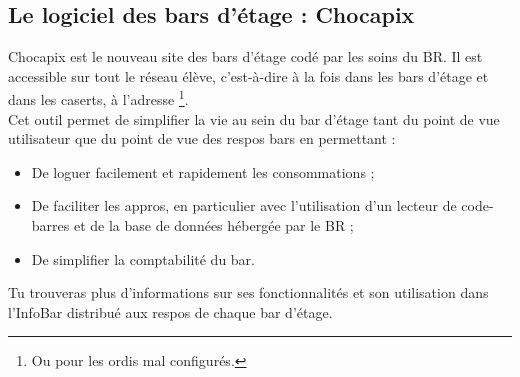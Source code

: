 \subsection{Le logiciel des bars d'étage : Chocapix}
\label{chocapix}


Chocapix est le nouveau site des bars d'étage codé par les soins du BR. Il est accessible sur tout le réseau élève, c'est-à-dire à la fois dans les bars d'étage et dans les caserts, à l'adresse \footnote{Ou  pour les ordis mal configurés.}.\\
Cet outil permet de simplifier la vie au sein du bar d'étage tant du point de vue utilisateur que du point de vue des respos bars en permettant :
\begin{itemize}
\item De loguer facilement et rapidement les consommations ;
\item De faciliter les appros, en particulier avec l'utilisation d'un lecteur de code-barres et de la base de données hébergée par le BR ;
\item De simplifier la comptabilité du bar.\\
\end{itemize}
Tu trouveras plus d'informations sur ses fonctionnalités et son utilisation dans l'InfoBar distribué aux respos de chaque bar d'étage.
